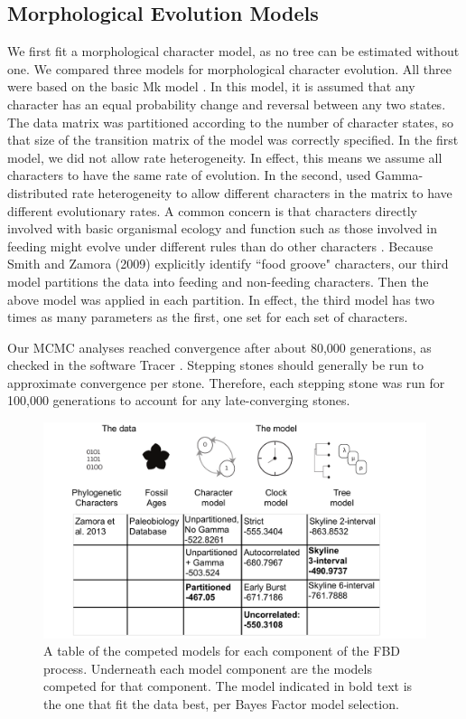 \documentclass{article}
\begin{document}
\subsection{Morphological Evolution Models}
We first fit a morphological character model, as no tree can be estimated without one.
We compared three models for morphological character evolution. 
All three were based on the basic Mk model \citep{Lewis2001}. 
In this model, it is assumed that any character has an equal probability change and reversal between any two states. 
The data matrix was partitioned according to the number of character states, so that size of the transition matrix of the model was correctly specified.
In the first model, we did not allow rate heterogeneity. 
In effect, this means we assume all characters to have the same rate of evolution.
In the second, used Gamma-distributed rate heterogeneity to allow different characters in the matrix to have different evolutionary rates.
A common concern is that characters directly involved with basic organismal ecology and function such as those involved in feeding might evolve under different rules than do other characters \citep{Foote1994,Foote1996a,Wagner1995,Sanchez-Villagra1998, Ciampaglio2002}. Because Smith and Zamora (2009) explicitly identify ``food groove" characters, our third model partitions the data into feeding and non-feeding characters.
Then the above model was applied in each partition.
In effect, the third model has two times as many parameters as the first, one set for each set of characters.

Our MCMC analyses reached convergence after about 80,000 generations, as checked in the software Tracer \citep{Rambaut2018}. 
Stepping stones should generally be run to approximate convergence per stone.
Therefore, each stepping stone was run for 100,000 generations to account for any late-converging stones.

\begin{figure}
  \includegraphics[width=\textwidth]{figures/Fig2.pdf}

  \caption{A table of the competed models for each component of the FBD process. Underneath each model component are the models competed for that component. The model indicated in bold text is the one that fit the data best, per Bayes Factor model selection.}
\end{figure}
\end{document}
